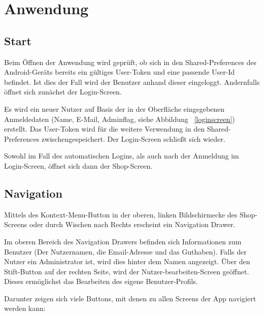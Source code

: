 \section{Anwendung}\label{sec:features}

\subsection{Start}\label{subsec:start}

Beim Öffnen der Anwendung wird geprüft, ob sich in den Shared-Preferences des Android-Geräts bereits ein gültiges User-Token und eine passende User-Id befindet.
Ist dies der Fall wird der Benutzer anhand dieser eingeloggt.
Andernfalls öffnet sich zunächst der Login-Screen.

Es wird ein neuer Nutzer auf Basis der in der Oberfläche eingegebenen Anmeldedaten (Name, E-Mail, Adminflag, siehe Abbildung ~\ref{loginscreen}) erstellt.
Das User-Token wird für die weitere Verwendung in den Shared-Preferences zwischengespeichert.
Der Login-Screen schließt sich wieder.

Sowohl im Fall des automatischen Logins, als auch nach der Anmeldung im Login-Screen, öffnet sich dann der Shop-Screen.


\subsection{Navigation} \label{subsec:navigation}

Mittels des Kontext-Menu-Button in der oberen, linken Bildschirmecke des Shop-Screens oder durch Wischen nach Rechts erscheint ein Navigation Drawer.

Im oberen Bereich des Navigation Drawers befinden sich Informationen zum Benutzer (Der Nutzernamen, die Email-Adresse und das Guthaben).
Falls der Nutzer ein Administrator ist, wird dies hinter dem Namen angezeigt.
Über den Stift-Button auf der rechten Seite, wird der Nutzer-bearbeiten-Screen geöffnet.
Dieses ermöglichst das Bearbeiten des eigene Benutzer-Profils.

Darunter zeigen sich viele Buttons, mit denen zu allen Screens der App navigiert werden kann:

